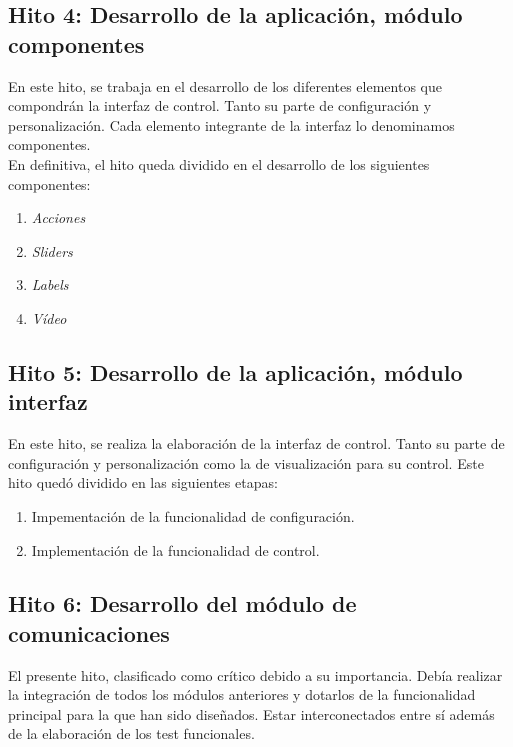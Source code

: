 \subsection{ Hito 4: Desarrollo de la aplicación, módulo componentes }
\label{subsec:hito4}

En este hito, se trabaja en el desarrollo de los diferentes elementos que compondrán la interfaz de control. Tanto su parte de configuración y personalización. 
Cada elemento integrante de la interfaz lo denominamos componentes.\\

En definitiva, el hito queda dividido en el desarrollo de los siguientes componentes:

\begin{enumerate}
 \item \emph{Acciones}
 \item \emph{Sliders}
 \item \emph{Labels}
 \item \emph{Vídeo}
\end{enumerate}


\subsection{Hito 5: Desarrollo de la aplicación, módulo interfaz }
\label{subsec:hito5}

En este hito, se realiza la elaboración de la interfaz de control. Tanto su parte de configuración y personalización como la de visualización para su control. Este hito quedó dividido 
en las siguientes etapas:

\begin{enumerate}
 \item Impementación de la funcionalidad de configuración.
 \item Implementación de la funcionalidad de control.
\end{enumerate}


\subsection{Hito 6: Desarrollo del módulo de comunicaciones }
\label{subsec:hito6}

El presente hito, clasificado como crítico debido a su importancia. Debía realizar la integración de todos los módulos anteriores y dotarlos de la funcionalidad principal para la que han sido diseñados. Estar interconectados 
entre sí además de la elaboración de los test funcionales.

